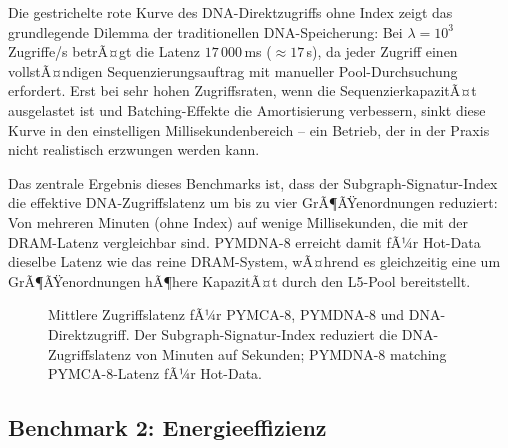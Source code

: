 ﻿\documentclass[a4paper,12pt]{article}
\theoremstyle{definition}
\begin{document}
Die gestrichelte rote Kurve des DNA-Direktzugriffs ohne Index zeigt das grundlegende Dilemma der traditionellen DNA-Speicherung: Bei $\lambda = 10^3$\,Zugriffe/s betrÃ¤gt die Latenz $17\,000$\,ms ($\approx 17$\,s), da jeder Zugriff einen vollstÃ¤ndigen Sequenzierungsauftrag mit manueller Pool-Durchsuchung erfordert. Erst bei sehr hohen Zugriffsraten, wenn die SequenzierkapazitÃ¤t ausgelastet ist und Batching-Effekte die Amortisierung verbessern, sinkt diese Kurve in den einstelligen Millisekundenbereich -- ein Betrieb, der in der Praxis nicht realistisch erzwungen werden kann.

Das zentrale Ergebnis dieses Benchmarks ist, dass der Subgraph-Signatur-Index die effektive DNA-Zugriffslatenz um bis zu vier GrÃ¶ÃŸenordnungen reduziert: Von mehreren Minuten (ohne Index) auf wenige Millisekunden, die mit der DRAM-Latenz vergleichbar sind. PYMDNA-8 erreicht damit fÃ¼r Hot-Data dieselbe Latenz wie das reine DRAM-System, wÃ¤hrend es gleichzeitig eine um GrÃ¶ÃŸenordnungen hÃ¶here KapazitÃ¤t durch den L5-Pool bereitstellt.

\begin{figure}[H]
  \centering
  \caption{Mittlere Zugriffslatenz fÃ¼r PYMCA-8, PYMDNA-8 und DNA-Direktzugriff.
    Der Subgraph-Signatur-Index reduziert die DNA-Zugriffslatenz von
    Minuten auf Sekunden; PYMDNA-8 matching PYMCA-8-Latenz fÃ¼r Hot-Data.}
  \label{fig:latenz_vergleich}
\end{figure}

\subsection{Benchmark 2: Energieeffizienz}
\end{document}
